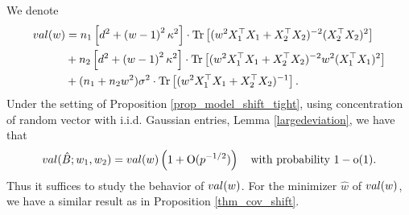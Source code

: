 	
We denote
\begin{align}
	val(w) &= n_1\left[d^2 +\left( w-1\right)^2\kappa^2\right]\cdot \operatorname{Tr}\left[( w^2X_1^{\top}X_1 +X_2^{\top}X_2)^{-2} (X_2^{\top}X_2)^2\right] \nonumber \\
	& + n_2\left[d^2 +\left( w-1\right)^2\kappa^2\right]\cdot \operatorname{Tr}\left[( w^2X_1^{\top}X_1 +X_2^{\top}X_2)^{-2} w^2(X_1^{\top}X_1)^2\right] \nonumber\\
			& + (n_1+n_2 w^2)\sigma^2 \cdot \operatorname{Tr}\left[(w^2X_1^{\top}X_1  + X_2^{\top}X_2)^{-1} \right]. \nonumber
\end{align}
Under the setting of Proposition \ref{prop_model_shift_tight}, using concentration of random vector with i.i.d. Gaussian entries, Lemma \ref{largedeviation}, we have that
$$val(\hat{B}; w_1, w_2)= val(w) \left( 1+\operatorname{O}(p^{-1/2})\right)\quad \text{with probability }1-\operatorname{o}(1).$$
Thus it suffices to study the behavior of $val (w)$. For the minimizer $\hat w$ of $val(w)$, we have a similar result as in Proposition \ref{thm_cov_shift}. 

